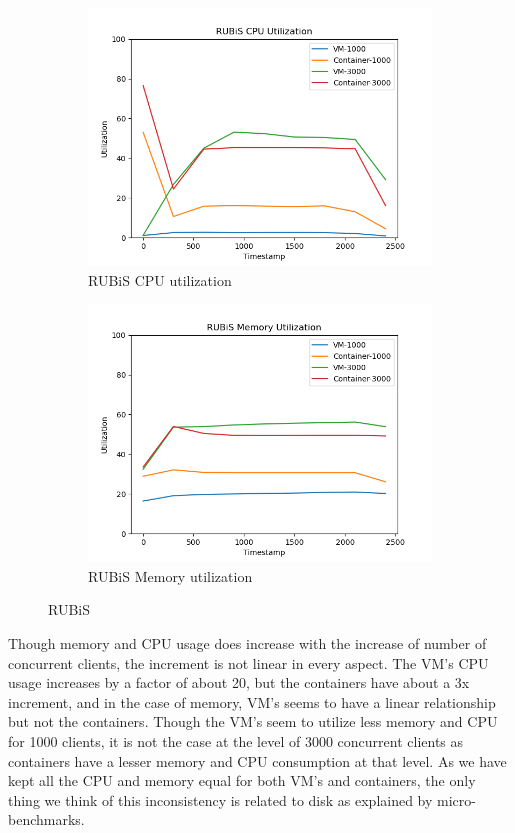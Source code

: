 \documentclass[11pt]{article}
\begin{document}
\begin{figure}[hbt!]
\centering
\begin{subfigure}{.5\textwidth}
  \centering
  \includegraphics[width=1.1\linewidth]{rubis_cpu_util.png}
  \caption{RUBiS CPU utilization}
  \label{fig:rub1}
\end{subfigure}%
\begin{subfigure}{.5\textwidth}
  \centering
  \includegraphics[width=1.1\linewidth]{rubis_mem_util.png}
  \caption{RUBiS Memory utilization}
  \label{fig:rub2}
\end{subfigure}
\caption{RUBiS}
\label{fig:rubis}
\end{figure}

Though memory and CPU usage does increase with the increase of number of concurrent clients, the increment is not linear in every aspect. The VM’s CPU usage increases by a factor of about 20, but the containers have about a 3x increment, and in the case of memory, VM's seems to have a linear relationship but not the containers. Though the VM's seem to utilize less memory and CPU for 1000 clients, it is not the case at the level of 3000 concurrent clients as containers have a lesser memory and CPU consumption at that level. As we have kept all the CPU and memory equal for both VM's and containers, the only thing we think of this inconsistency is related to disk as explained by micro-benchmarks.
\end{document}
